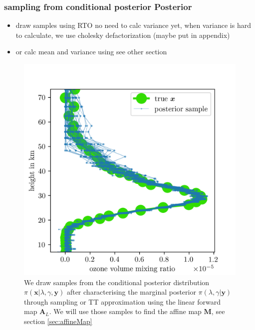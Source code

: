 \subsubsection{sampling from conditional posterior Posterior}
\begin{itemize}
	\item draw samples using RTO no need to calc variance yet, when variance is hard to calculate, we use cholesky defactorization (maybe put in appendix)
	\item or calc mean and variance using see other section
\end{itemize}
\begin{figure}[ht!]
	\centering
	\includegraphics{FirstTestRes.png}
	\caption[Ozone samples of the conditional posterior.]{We draw samples from the conditional posterior distribution  $\pi(\bm{x}|\lambda,\gamma , \bm{y})$ after characterising the marginal posterior $\pi(\lambda,\gamma | \bm{y})$ through sampling or TT approximation using the linear forward map $\bm{A}_L$. We will use those samples to find the affine map $\bm{M}$, see section \ref{sec:affineMap}}
	\label{fig:O3Samp}
\end{figure}


